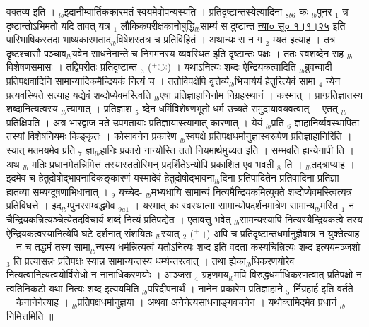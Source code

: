 \documentclass[article,12pt,a4paper]{memoir}%
\newcommand{\add}[1]{($^{+}$#1)}
\begin{document}
वक्तव्य इति । {\tiny $_{lb}$}इदानीम्वार्तिककारमतं स्वयमेवोपन्यस्यति । {\color{DodgerBlue3}प्रतिदृष्टान्तस्येत्यादिना} {\tiny $_{8b6}$} कः {\tiny $_{lb}$}पुनर {\tiny $_{1}$} त्र दृष्टान्तोऽभिमतो यदि तावत् यत्र {\tiny $_{1}$} लौकिकपरीक्षकानोबुद्धि{\tiny $_{lb}$}साम्यं स दुष्टान्त \href{http://sarit.indology.info/?cref=ns\%C5\%AB.1.1.25}{न्या० सू० १।१।२५} इति पारिभाषिकस्तदा भाष्यकारमताद{\tiny $_{lb}$}विषेशस्तत्र च प्रतिविहितं । अथान्यः स न ग {\tiny $_{2}$} म्यत इत्याह । तत्र दृष्टश्चासौ पञ्चाव{\tiny $_{lb}$}यवेन साधनेनान्ते च निगमनस्य व्यवस्थित इति दृष्टान्तः पक्षः । ततः स्वशब्देन सह {\tiny $_{lb}$}विशेषणसमासः । तद्विपरीतः प्रतिदृष्टान्त {\tiny $_{3}$} \add{ः} । यथाऽनित्यः शब्दः ऐन्द्रियकत्वादिति {\tiny $_{lb}$}ब्रुवन्वादी प्रतिपक्षवादिनि सामान्यादिकमैन्द्रियकं नित्यं च । ततोविपक्षेपि वृत्तेर्व्य{\tiny $_{lb}$}भिचार्ययं हेतुरित्येवं सामा {\tiny $_{4}$} न्येन प्रत्यवस्थिते सत्याह यद्येवं शब्दोप्येवमस्त्विति {\tiny $_{lb}$}एषा प्रतिज्ञाहानिर्नाम निग्रहस्थानं । कस्मात् । प्राग्प्रतिज्ञातस्य शब्दानित्यत्वस्य {\tiny $_{lb}$}त्यागात् । प्रतिज्ञाश {\tiny $_{5}$} ब्देन धर्मिविशेषणभूतो धर्म उच्यते समुदायावयवत्वात् । एतत् {\tiny $_{lb}$}प्रतिक्षिपति । अत्र {\color{DodgerBlue3}भारद्वाज} मते उपगतायाः प्रतिज्ञायास्त्यागात् कारणात् । येयं {\tiny $_{lb}$}प्रति {\tiny $_{6}$} ज्ञाहानिर्व्यवस्थापिता तस्यां विशेषनियमः किङ्कृतः । कोसावनेन प्रकारेण {\tiny $_{lb}$}स्वपक्षे प्रतिपक्षधर्मानुज्ञास्वरूपेण प्रतिज्ञाहानिरिति । स्यात् मतमयमेव प्रति {\tiny $_{7}$} ज्ञा{\tiny $_{lb}$}हानिः प्रकारो नान्योस्ति ततो नियमार्थमुच्यत इति । {\color{DodgerBlue3}सम्भवति ह्यन्येनापी} ति । अथ {\tiny $_{lb}$} \leavevmode{} मतिः प्रधानमेतन्निमित्तं तस्यास्ततोस्मिन् प्रदर्शितेऽन्योपि प्रकाशित एव भवती {\tiny $_{8}$} ति । {\tiny $_{lb}$}तदत्राप्याह । इदमेव च हेतुदोषोद्भावनादिकङ्कारणं यस्मादेवं हेतुदोषोद्भावना{\tiny $_{lb}$}दिना प्रतिपादितेन प्रतिवादिना प्रतिज्ञा हातव्या सम्यग्दूषणाभिधानात् । {\tiny $_{9}$} \leavevmode{} यच्चेद- {\tiny $_{lb}$}मभ्यधायि सामान्यं नित्यमैन्द्र्यिकमित्युक्ते शब्दोप्येवमस्त्वित्यत्र प्रतिविधत्ते । {\color{DodgerBlue3}इद{\tiny $_{lb}$}म्पुनरसम्बद्धमेव} {\tiny $_{9a1}$} । यस्मात् कः स्वस्थात्मा सामान्योपदर्शनमात्रेण सामान्य{\tiny $_{lb}$}मस्ति {\tiny $_{1}$} न चैन्द्रियकन्नित्यञ्चेत्येतदविचार्य शब्दं नित्यं प्रतिपद्येत । एतावत्तु भवेत् {\tiny $_{lb}$}सामन्यस्यापि नित्यस्यैन्द्रियकत्वे तस्य ऐन्द्रियकत्वस्यानित्येपि घटे दर्शनात् संशयितः {\tiny $_{lb}$}स्यात् {\tiny $_{2}$} \add{।} अपि च प्रतिदृष्टान्तधर्मानुज्ञैवात्र न युक्तेत्याह । न च तद्धमं तस्य सामा{\tiny $_{lb}$}न्यस्य धर्मन्नित्यत्वं यतोऽनित्यः शब्द इति वदता कस्यचिन्नित्यः शब्द इत्ययमञ्जशो{\tiny $_{3}$} ति प्रत्यासन्नः प्रतिपक्षः स्यान्न सामान्यन्तस्य धर्म्यन्तरत्वात् । तथा ह्येका{\tiny $_{lb}$}धिकरणयोरेव नित्यत्वानित्यत्वयोर्विरोधो न नानाधिकरणयोः । आञ्जस {\tiny $_{4}$} ग्रहणमय{\tiny $_{lb}$}मपि विरुद्धधर्माधिकरणत्वात् प्रतिपक्षो न त्वतिनिकटो यथा नित्यः शब्द इत्ययमिति {\tiny $_{lb}$}परिदीपनार्थं । नानेन प्रकारेण प्रतिज्ञाहाने {\tiny $_{5}$} र्निग्रहार्ह इति वर्तते । केनानेनेत्याह । {\tiny $_{lb}$}प्रतिपक्षधर्मानुज्ञया । अथवा अनेनेत्यसाधनाङ्गवचनेन । यथोक्तमिदमेव प्रधानं {\tiny $_{lb}$}निमित्तमिति ॥
\end{document}
